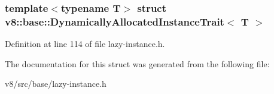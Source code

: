 \subsubsection*{template$<$typename T$>$\newline
struct v8\+::base\+::\+Dynamically\+Allocated\+Instance\+Trait$<$ T $>$}



Definition at line 114 of file lazy-\/instance.\+h.



The documentation for this struct was generated from the following file\+:\begin{DoxyCompactItemize}
\item 
v8/src/base/lazy-\/instance.\+h\end{DoxyCompactItemize}
